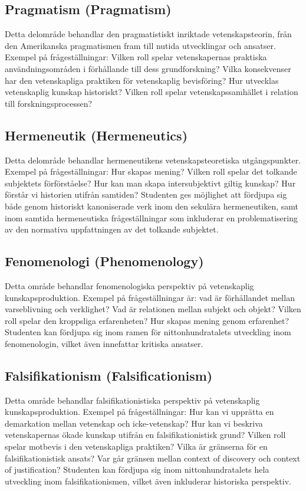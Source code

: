 \documentclass[12pt,a4paper]{article}
\begin{document}
\subsection{Pragmatism (Pragmatism)}
Detta delområde behandlar den pragmatistiskt inriktade vetenskapsteorin, från den Amerikanska pragmatismen fram till nutida utvecklingar och ansatser. Exempel på frågeställningar: Vilken roll spelar vetenskapernas praktiska användningsområden i förhållande till dess grundforskning? Vilka konsekvenser har den vetenskapliga praktiken för vetenskaplig bevisföring? Hur utvecklas vetenskaplig kunskap historiskt? Vilken roll spelar vetenskapssamhället i relation till forskningsprocessen?

\subsection{Hermeneutik (Hermeneutics)}
Detta delområde behandlar hermeneutikens vetenskapsteoretiska utgångspunkter. Exempel på frågeställningar: Hur skapas mening? Vilken roll spelar det tolkande subjektets förförståelse? Hur kan man skapa intersubjektivt giltig kunskap? Hur förstår vi historien utifrån samtiden? Studenten ges möjlighet att fördjupa sig både genom historiskt kanoniserade verk inom den sekulära hermeneutiken, samt inom samtida hermeneutiska frågeställningar som inkluderar en problematisering av den normativa uppfattningen av det tolkande subjektet. 

\subsection{Fenomenologi (Phenomenology)} Detta område behandlar fenomenologiska perspektiv på vetenskaplig kunskapsproduktion. Exempel på frågeställningar är: vad är förhållandet mellan varseblivning och verklighet? Vad är relationen mellan subjekt och objekt? Vilken roll spelar den kroppsliga erfarenheten? Hur skapas mening genom erfarenhet? Studenten kan fördjupa sig inom ramen för nittonhundratalets utveckling inom fenomenologin, vilket även innefattar kritiska ansatser. 

\subsection{Falsifikationism (Falsificationism)}
Detta område behandlar falsifikationistiska perspektiv på vetenskaplig kunskapsproduktion. Exempel på frågeställningar: Hur kan vi upprätta en demarkation mellan vetenskap och icke-vetenskap? Hur kan vi beskriva vetenskapernas ökade kunskap utifrån en falsifikationistisk grund? Vilken roll spelar motbevis i den vetenskapliga praktiken? Vilka är gränserna för en falsifikationistisk ansats? Var går gränsen mellan context of discovery och context of justification? Studenten kan fördjupa sig inom nittonhundratalets hela utveckling inom falsifikationismen, vilket även inkluderar historiska perspektiv. 
\end{document}
